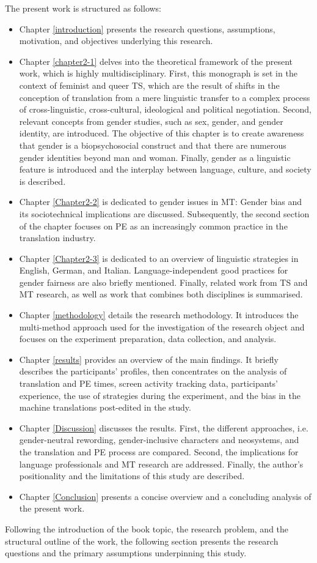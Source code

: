 The present work is structured as follows: 
\begin{itemize}
\setlength\itemsep{-0.5em}
    \item Chapter \ref{introduction} presents the research questions, assumptions, motivation, and objectives underlying this research.
    \item Chapter \ref{chapter2-1} delves into the theoretical framework of the present work, which is highly multidisciplinary. First, this monograph is set in the context of feminist and queer TS, which are the result of shifts in the conception of translation from a mere linguistic transfer to a complex process of cross-linguistic, cross-cultural, ideological and political negotiation. Second, relevant concepts from gender studies, such as sex, gender, and gender identity, are introduced. The objective of this chapter is to create awareness that gender is a biopsychosocial construct and that there are numerous gender identities beyond man and woman. Finally, gender as a linguistic feature is introduced and the interplay between language, culture, and society is described. 
    \item Chapter \ref{Chapter2-2} is dedicated to gender issues in MT: Gender bias and its sociotechnical implications are discussed. Subsequently, the second section of the chapter focuses on PE as an increasingly common practice in the translation industry.
    \item Chapter \ref{Chapter2-3} is dedicated to an overview of linguistic strategies in English, German, and Italian. Language-independent good practices for gender fairness are also briefly mentioned. Finally, related work from TS and MT research, as well as work that combines both disciplines is summarised.
    \item Chapter \ref{methodology} details the research methodology. It introduces the multi-method approach used for the investigation of the research object and focuses on the experiment preparation, data collection, and analysis.
    \item Chapter \ref{results} provides an overview of the main findings. It briefly describes the participants' profiles, then concentrates on the analysis of translation and PE times, screen activity tracking data, participants' experience, the use of strategies during the experiment, and the bias in the machine translations post-edited in the study.
    \item Chapter \ref{Discussion} discusses the results. First, the different  approaches, i.e. gender-neutral rewording, gender-inclusive characters and neosystems, and the translation and PE process are compared. Second, the implications for language professionals and MT research are addressed. Finally, the author's positionality and the limitations of this study are described.
    \item Chapter \ref{Conclusion} presents a concise overview and a concluding analysis of the present work.  
\end{itemize}
Following the introduction of the book topic, the research problem, and the structural outline of the work, the following section presents the research questions and the primary assumptions underpinning this study.


